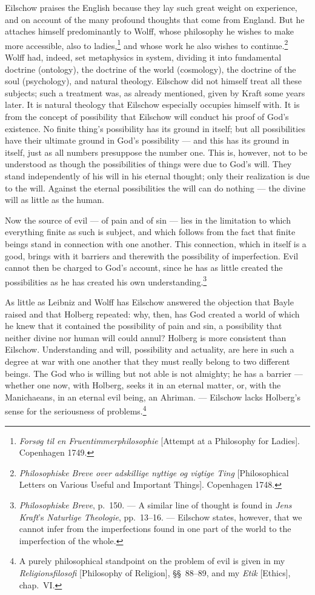 \documentclass[12pt,a4paper]{book}
\newcommand{\opage}[1]{\marginnote{\footnotesize\textit{[#1]}}}
\begin{document}
Eilschow praises the English because they lay such great weight on experience,
and on account of the many profound thoughts that come from England. But he
attaches himself predominantly to Wolff, whose philosophy he wishes to make more
accessible, also to ladies,\footnote{\emph{Forsøg til en Fruentimmerphilosophie}
[Attempt at a Philosophy for Ladies]. Copenhagen 1749.} and whose work he also
wishes to continue.\footnote{\emph{Philosophiske Breve over adskillige nyttige og
vigtige Ting} [Philosophical Letters on Various Useful and Important Things].
Copenhagen 1748.} Wolff had, indeed, set metaphysics in system, dividing it into
fundamental doctrine (ontology), the doctrine of the world (cosmology), the
doctrine of the soul (psychology), and natural theology. Eilschow did not himself
treat all these subjects; such a treatment was, as already mentioned, given by
Kraft some years later. It is natural theology that Eilschow \opage{22}especially occupies
himself with. It is from the concept of possibility that Eilschow will conduct his
proof of God's existence. No finite thing's possibility has its ground in itself;
but all possibilities have their ultimate ground in God's possibility --- and
this has its ground in itself, just as all numbers presuppose the number one.
This is, however, not to be understood as though the possibilities of things were
due to God's will. They stand independently of his will in his eternal thought;
only their realization is due to the will. Against the eternal possibilities the
will can do nothing --- the divine will as little as the human.

Now the source of evil --- of pain and of sin --- lies in the limitation to which
everything finite as such is subject, and which follows from the fact that finite
beings stand in connection with one another. This connection, which in itself is
a good, brings with it barriers and therewith the possibility of imperfection.
Evil cannot then be charged to God's account, since he has as little created the
possibilities as he has created his own understanding.\footnote{\emph{Philosophiske
Breve}, p.~150. --- A similar line of thought is found in \emph{Jens Kraft}'s
\emph{Naturlige Theologie}, pp.~13--16. --- Eilschow states, however, that we
cannot infer from the imperfections found in one part of the world to the
imperfection of the whole.}

As little as Leibniz and Wolff has Eilschow answered the objection that Bayle
raised and that Holberg repeated: why, then, has God created a world of which he
knew that it contained the possibility of pain and sin, a possibility that neither
divine nor human will could annul? Holberg is more consistent than Eilschow.
Understanding and will, possibility and actuality, are here in such a degree at
war with one another that they must really belong to two different beings. The God
who is willing but not able is not almighty; he has a barrier --- whether one
now, with Holberg, seeks it in an eternal matter, or, with the Manichaeans, in an
eternal evil being, an Ahriman. --- Eilschow lacks Holberg's sense for the
seriousness of problems.\footnote{A purely philosophical standpoint on the problem
of evil is given in my \emph{Religionsfilosofi} [Philosophy of Religion],
§§~88--89, and my \emph{Etik} [Ethics], chap.~VI.}
\end{document}
